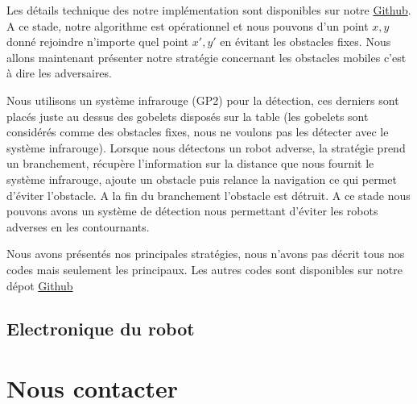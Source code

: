 \documentclass[a4paper,10pt]{article}
\begin{document}
\begin{spacing}{1.5}
Les détails technique des notre implémentation sont disponibles sur notre
\href{https://github.com/eirbot/eirbot2020-1A/blob/master/code/rasp/src/navigation.cpp}{Github}.
A ce stade, notre algorithme est opérationnel et nous pouvons d'un point $x,y$
donné rejoindre n'importe quel point $x',y'$ en évitant les obstacles fixes.
Nous allons maintenant présenter notre stratégie concernant les obstacles
mobiles c'est à dire les adversaires.

Nous utilisons un système infrarouge (GP2) pour la détection, ces derniers sont
placés juste au dessus des gobelets disposés sur la table (les gobelets sont
considérés comme des obstacles fixes, nous ne voulons pas les détecter avec le
système infrarouge). Lorsque nous détectons un robot adverse, la stratégie prend
un branchement, récupère l'information sur la distance que nous fournit le
système infrarouge, ajoute un obstacle puis relance la navigation ce qui permet d'éviter l'obstacle.
A la fin du branchement l'obstacle est détruit. A ce stade nous pouvons avons un
système de détection nous permettant d'éviter les robots adverses en les
contournants.

Nous avons présentés nos principales stratégies, nous n'avons pas décrit tous
nos codes mais seulement les principaux. Les autres codes sont disponibles sur
notre dépot \href{https://github.com/eirbot/eirbot2020-1A}{Github}


\subsection{Electronique du robot}

\newpage
\section{Nous contacter}

\newpage
\end{spacing}
\end{document}
